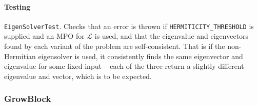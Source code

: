  \paragraph{Testing} \lstinline$EigenSolverTest$. Checks that an error is thrown if \lstinline$HERMITICITY_THRESHOLD$ is supplied and an MPO for \(\mathcal{L}\) is used, and that the eigenvalue and eigenvectors found by each variant of the problem are self-consistent. That is if the non-Hermitian eigensolver is used, it consistently finds the same eigenvector and eigenvalue for some fixed input -- each of the three return a slightly different eigenvalue and vector, which is to be expected.
 
 \subsubsection{GrowBlock}
